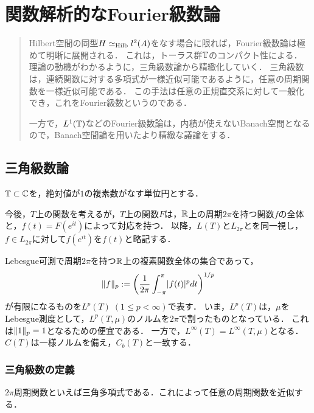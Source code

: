\documentclass[uplatex,dvipdfmx]{jsreport}
\begin{document}
\chapter{関数解析的なFourier級数論}

\begin{quotation}
    Hilbert空間の同型$H\simeq_{\mathrm{Hilb}} l^2(A)$をなす場合に限れば，Fourier級数論は極めて明晰に展開される．
    これは，トーラス群$\mathbb{T}$のコンパクト性による．
    理論の動機がわかるように，三角級数論から精緻化していく．
    三角級数は，連続関数に対する多項式が一様近似可能であるように，任意の周期関数を一様近似可能である．
    この手法は任意の正規直交系に対して一般化でき，これをFourier級数というのである．

    一方で，$L^1(\mathbb{T})$などのFourier級数論は，内積が使えないBanach空間となるので，Banach空間論を用いたより精緻な議論をする．
\end{quotation}

\section{三角級数論}

\begin{notation}
    $\mathbb{T}\subset\mathbb{C}$を，絶対値が$1$の複素数がなす単位円とする．
\end{notation}
\begin{discussion}
    今後，$T$上の関数を考えるが，$T$上の関数$F$は，$\mathbb{R}$上の周期$2\pi$を持つ関数$f$の全体と，$f(t)=F(e^{it})$によって対応を持つ．
    以降，$L(T)$と$L_{2\pi}$とを同一視し，$f\in L_{2\pi}$に対して$f(e^{it})$を$f(t)$と略記する．
\end{discussion}

\begin{notation}
    Lebesgue可測で周期$2\pi$を持つ$\mathbb{R}$上の複素関数全体の集合であって，
    \[\|f\|_p:=\left(\frac{1}{2\pi}\int^\pi_{-\pi}\lvert f(t)\rvert^pdt\right)^{1/p}\]
    が有限になるものを$L^p(T)\;(1\le p<\infty)$で表す．
    いま，$L^p(T)$は，$\mu$をLebesgue測度として，$L^p(T,\mu)$のノルムを$2\pi$で割ったものとなっている．
    これは$\|1\|_p=1$となるための便宜である．
    一方で，$L^\infty(T)=L^\infty(T,\mu)$となる．
    $C(T)$は一様ノルムを備え，$C_b(T)$と一致する．
\end{notation}

\subsection{三角級数の定義}

\begin{tcolorbox}[colframe=ForestGreen, colback=ForestGreen!10!white,breakable,colbacktitle=ForestGreen!40!white,coltitle=black,fonttitle=\bfseries\sffamily,
title=]
    $2\pi$周期関数といえば三角多項式である．これによって任意の周期関数を近似する．
\end{tcolorbox}
\end{document}
